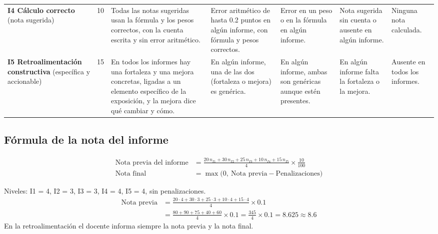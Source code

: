 \documentclass[11pt,a4paper]{article}
\begin{document}
\begin{landscape}
{\begin{xltabular}{\linewidth}{@{}L{3.0cm}C{0.8cm}YYYYL{2.2cm}@{}}
	\addlinespace
	\textbf{I4 Cálculo correcto} (nota sugerida) & 10 & Todas las notas sugeridas usan la fórmula y los pesos correctos, con la cuenta escrita y sin error aritmético. & Error aritmético de hasta 0.2 puntos en algún informe, con fórmula y pesos correctos. & Error en un peso o en la fórmula en algún informe. & Nota sugerida sin cuenta o ausente en algún informe. & Ninguna nota calculada. \\
	\addlinespace
	\textbf{I5 Retroalimentación constructiva} (específica y accionable) & 15 & En todos los informes hay una fortaleza y una mejora concretas, ligadas a un elemento específico de la exposición, y la mejora dice qué cambiar y cómo. & En algún informe, una de las dos (fortaleza o mejora) es genérica. & En algún informe, ambas son genéricas aunque estén presentes. & En algún informe falta la fortaleza o la mejora. & Ausente en todos los informes. \\
\end{xltabular}
}
\end{landscape}

\subsection{Fórmula de la nota del informe}

\begin{align*}
	\text{Nota previa del informe} &= \frac{20\,n_{I1} + 30\,n_{I2} + 25\,n_{I3} + 10\,n_{I4} + 15\,n_{I5}}{4} \times \frac{10}{100}\\
	\text{Nota final} &= \max\bigl(0,\ \text{Nota previa} - \text{Penalizaciones}\bigr)
\end{align*}

\begin{okBox}[title={Ejemplo de cálculo de la nota del informe}]
	Niveles: I1 = 4, I2 = 3, I3 = 3, I4 = 4, I5 = 4, sin penalizaciones.
	\begin{align*}
		\text{Nota previa} &= \frac{20 \cdot 4 + 30 \cdot 3 + 25 \cdot 3 + 10 \cdot 4 + 15 \cdot 4}{4} \times 0.1\\
		&= \frac{80 + 90 + 75 + 40 + 60}{4} \times 0.1 = \frac{345}{4} \times 0.1 = 8.625 \approx 8.6
	\end{align*}
	En la retroalimentación el docente informa siempre la nota previa y la nota final.
\end{okBox}

\printbibliography[heading=bibintoc,title={Referencias}]

\clearpage
\appendix
\end{document}
